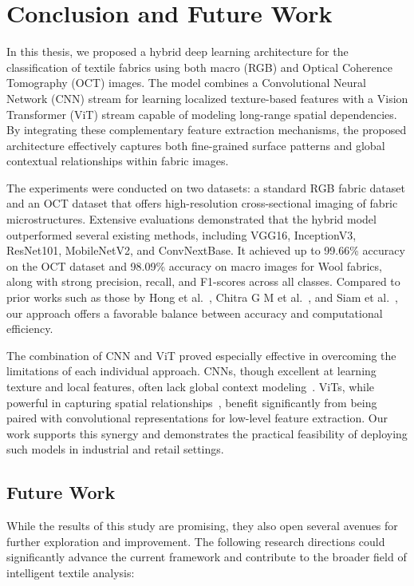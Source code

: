 \section{Conclusion and Future Work}

In this thesis, we proposed a hybrid deep learning architecture for the classification of textile fabrics using both macro (RGB) and Optical Coherence Tomography (OCT) images. The model combines a Convolutional Neural Network (CNN) stream for learning localized texture-based features with a Vision Transformer (ViT) stream capable of modeling long-range spatial dependencies. By integrating these complementary feature extraction mechanisms, the proposed architecture effectively captures both fine-grained surface patterns and global contextual relationships within fabric images.

The experiments were conducted on two datasets: a standard RGB fabric dataset and an OCT dataset that offers high-resolution cross-sectional imaging of fabric microstructures. Extensive evaluations demonstrated that the hybrid model outperformed several existing methods, including VGG16, InceptionV3, ResNet101, MobileNetV2, and ConvNextBase. It achieved up to 99.66\% accuracy on the OCT dataset and 98.09\% accuracy on macro images for Wool fabrics, along with strong precision, recall, and F1-scores across all classes. Compared to prior works such as those by Hong et al.~\cite{hong2024research}, Chitra G M et al.~\cite{chitra2023fabric}, and Siam et al.~\cite{siam2023textilenet}, our approach offers a favorable balance between accuracy and computational efficiency.

The combination of CNN and ViT proved especially effective in overcoming the limitations of each individual approach. CNNs, though excellent at learning texture and local features, often lack global context modeling~\cite{simonyan2015vgg}. ViTs, while powerful in capturing spatial relationships~\cite{dosovitskiy2020vit}, benefit significantly from being paired with convolutional representations for low-level feature extraction. Our work supports this synergy and demonstrates the practical feasibility of deploying such models in industrial and retail settings.

\subsection*{Future Work}

While the results of this study are promising, they also open several avenues for further exploration and improvement. The following research directions could significantly advance the current framework and contribute to the broader field of intelligent textile analysis:

